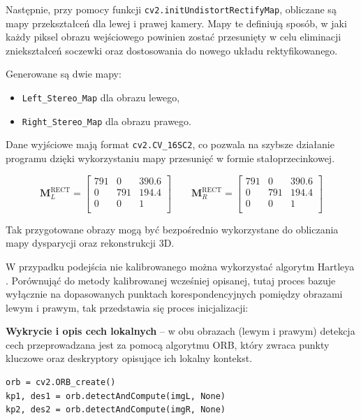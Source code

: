 \documentclass[magisterska]{pracadypl}
\begin{document}
Następnie, przy pomocy funkcji \texttt{cv2.initUndistortRectifyMap}, obliczane są mapy przekształceń dla lewej i prawej kamery. 
Mapy te definiują sposób, w jaki każdy piksel obrazu wejściowego powinien zostać przesunięty w celu eliminacji zniekształceń soczewki oraz dostosowania do nowego układu rektyfikowanego.

Generowane są dwie mapy:

\begin{itemize}
    \item \texttt{Left\_Stereo\_Map} dla obrazu lewego,
    \item \texttt{Right\_Stereo\_Map} dla obrazu prawego.
\end{itemize}

Dane wyjściowe mają format \texttt{cv2.CV\_16SC2}, co pozwala na szybsze działanie programu dzięki wykorzystaniu mapy przesunięć w formie stałoprzecinkowej.

\[
\mathbf{M}_L^\text{RECT} =
\begin{bmatrix}
791 & 0 & 390.6 \\
0 & 791 & 194.4 \\
0 & 0 & 1 \\
\end{bmatrix}
\qquad
\mathbf{M}_R^\text{RECT} =
\begin{bmatrix}
791 & 0 & 390.6 \\
0 & 791 & 194.4 \\
0 & 0 & 1 \\
\end{bmatrix}
\]

Tak przygotowane obrazy mogą być bezpośrednio wykorzystane do obliczania mapy dysparycji oraz rekonstrukcji 3D.

W przypadku podejścia nie kalibrowanego można wykorzystać algorytm Hartleya \cite{hartley}. Porównująć do metody kalibrowanej wcześniej opisanej, tutaj proces bazuje wyłącznie na dopasowanych punktach korespondencyjnych pomiędzy obrazami lewym i prawym, tak przedstawia się proces inicjalizacji: 

\textbf{Wykrycie i opis cech lokalnych} – w obu obrazach (lewym i prawym) detekcja cech przeprowadzana jest za pomocą algorytmu ORB, który zwraca punkty kluczowe oraz deskryptory opisujące ich lokalny kontekst.

\begin{lstlisting}[style=mypython]
orb = cv2.ORB_create()
kp1, des1 = orb.detectAndCompute(imgL, None)
kp2, des2 = orb.detectAndCompute(imgR, None)
\end{lstlisting}
\end{document}
